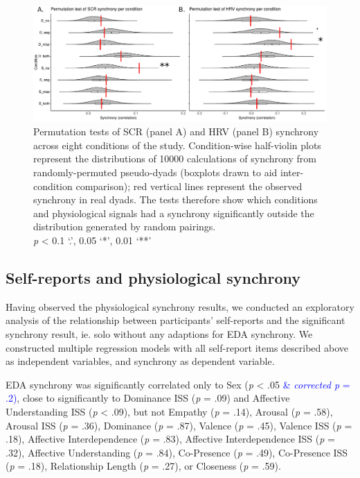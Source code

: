 \documentclass[manuscript, review = false, screen]{acmart}
\begin{document}
\begin{figure}[!ht]
    \centering
    \includegraphics[width=\textwidth]{images/sync_SCR+HRV}
    \caption{Permutation tests of SCR (panel A) and HRV (panel B) synchrony across eight conditions of the study. Condition-wise half-violin plots represent the distributions of 10000 calculations of synchrony from randomly-permuted pseudo-dyads (boxplots drawn to aid inter-condition comparison); red vertical lines represent the observed synchrony in real dyads. The tests therefore show which conditions and physiological signals had a synchrony significantly outside the distribution generated by random pairings.\\ {\it p} < 0.1 `.', 0.05 `*', 0.01 `**'}
    \label{fig:permutation}
\end{figure}

\subsection{Self-reports and physiological synchrony}
Having observed the physiological synchrony results, we conducted an exploratory analysis of the relationship between participants' self-reports and the significant synchrony result, ie. solo without any adaptions for EDA synchrony. We constructed multiple regression models with all self-report items described above as independent variables, and synchrony as dependent variable.

EDA synchrony was significantly correlated only to Sex (\textit{p} < .05 \textcolor{blue}{ \& \textit{corrected p} = .2)}, close to significantly to Dominance ISS (\textit{p} = .09) and Affective Understanding ISS (\textit{p} < .09), but not Empathy (\textit{p} = .14), Arousal (\textit{p} = .58), Arousal ISS (\textit{p} = .36), Dominance (\textit{p} = .87), Valence (\textit{p} = .45), Valence ISS (\textit{p} = .18), Affective Interdependence (\textit{p} = .83), Affective Interdependence ISS (\textit{p} = .32), Affective Understanding (\textit{p} = .84), Co-Presence (\textit{p} = .49), Co-Presence ISS (\textit{p} = .18), Relationship Length (\textit{p} = .27), or Closeness (\textit{p} = .59). 
\end{document}
